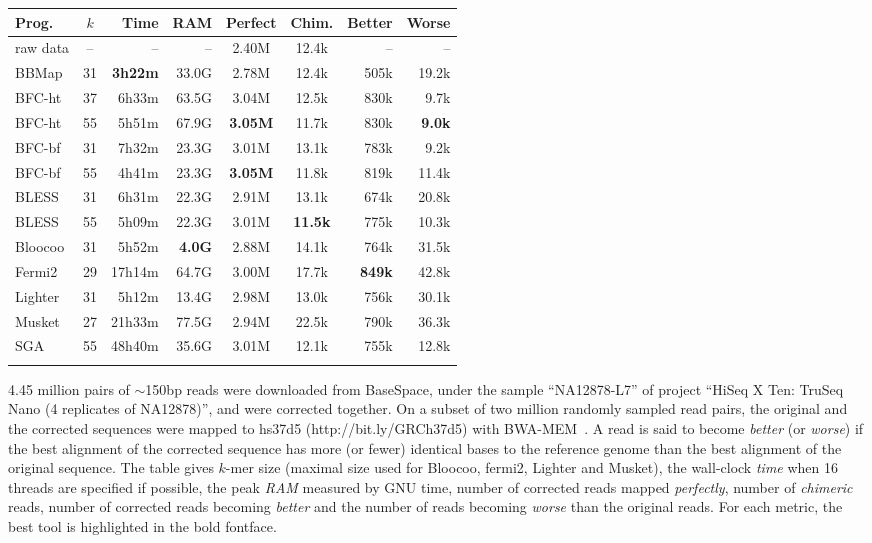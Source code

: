 \documentclass{bioinfo}
\begin{document}
\begin{table}[t]
{\footnotesize
\begin{tabular}{lcrrccrr}
\toprule
Prog.     & $k$ & Time  & RAM   & Perfect&Chim.& Better & Worse \\
\midrule
raw data  & --  & --    & --    & 2.40M  & 12.4k  & --     & -- \\
BBMap     & 31  &{\bf 3h22m}&33.0G& 2.78M& 12.4k  & 505k   & 19.2k \\
BFC-ht    & 37  & 6h33m & 63.5G & 3.04M  & 12.5k  & 830k   & 9.7k \\
BFC-ht    & 55  & 5h51m & 67.9G &{\bf 3.05M}&11.7k& 830k   &{\bf 9.0k}\\
BFC-bf    & 31  & 7h32m & 23.3G & 3.01M  & 13.1k  & 783k   & 9.2k \\
BFC-bf    & 55  & 4h41m & 23.3G &{\bf 3.05M}&11.8k& 819k   & 11.4k \\
BLESS     & 31  & 6h31m & 22.3G & 2.91M  & 13.1k  & 674k   & 20.8k \\
BLESS     & 55  & 5h09m & 22.3G & 3.01M  &{\bf 11.5k}& 775k& 10.3k \\
Bloocoo   & 31  & 5h52m &{\bf 4.0G}&2.88M& 14.1k  & 764k   & 31.5k  \\
Fermi2    & 29  &17h14m & 64.7G & 3.00M  & 17.7k  &{\bf 849k}&42.8k \\
Lighter   & 31  & 5h12m & 13.4G & 2.98M  & 13.0k  & 756k   & 30.1k  \\
Musket    & 27  &21h33m & 77.5G & 2.94M  & 22.5k  & 790k   & 36.3k  \\
SGA       & 55  &48h40m & 35.6G & 3.01M  & 12.1k  & 755k   & 12.8k  \\
\botrule
\end{tabular}}{4.45 million pairs of $\sim$150bp reads were downloaded from
BaseSpace, under the sample ``NA12878-L7'' of project ``HiSeq X Ten: TruSeq
Nano (4 replicates of NA12878)'', and were corrected together. On a subset of
two million randomly sampled read pairs, the original and the corrected
sequences were mapped to hs37d5 (http://bit.ly/GRCh37d5) with
BWA-MEM~\citep{Li:2013aa}.  A read is said to become \emph{better} (or
\emph{worse}) if the best alignment of the corrected sequence has more (or
fewer) identical bases to the reference genome than the best alignment of the
original sequence. The table gives $k$-mer size (maximal size used for Bloocoo,
fermi2, Lighter and Musket), the wall-clock \emph{time} when 16 threads are
specified if possible, the peak \emph{RAM} measured by GNU time, number of
corrected reads mapped \emph{perfectly}, number of \emph{chimeric} reads,
number of corrected reads becoming \emph{better} and the number of reads
becoming \emph{worse} than the original reads. For each metric, the best tool
is highlighted in the bold fontface.}
\end{table}
\end{document}
